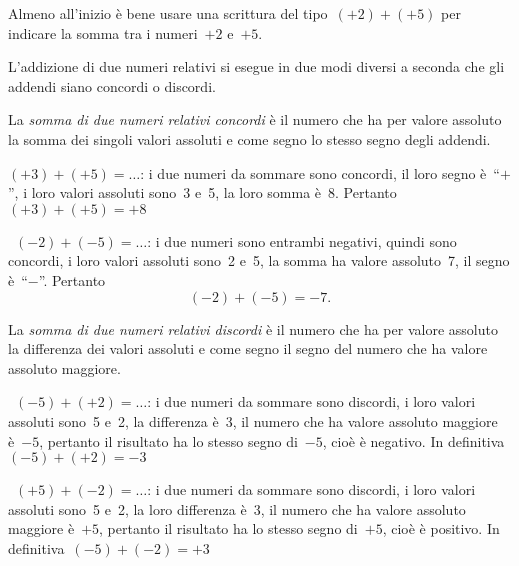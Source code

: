 Almeno all'inizio è bene usare una scrittura del tipo~\((+2)+(+5)\) per 
indicare la somma tra i numeri~\(+2\) e~\(+5\).

L'addizione di due numeri relativi si esegue in due modi diversi a seconda 
che 
gli addendi siano concordi o discordi.

La \emph{somma di due numeri relativi concordi} è il numero che ha per 
valore 
assoluto la somma dei singoli valori assoluti e
come segno lo stesso segno degli addendi.
 \begin{esempio}{}{}
\( (+3)+(+5)=\ldots\): i due numeri da sommare sono concordi, 
il loro segno è~``\(+\)'', i loro valori assoluti sono~3 e~5,
la loro somma è~8. Pertanto~\((+3)+(+5)=+8\)
 \end{esempio}

 \begin{esempio}{}{}
~\((-2)+(-5)=\ldots\): i due numeri sono entrambi negativi, quindi sono 
concordi, 
i loro valori assoluti sono~2 e~5,
la somma ha valore assoluto~7, il segno è~``\(-\)''. Pertanto
\[(-2)+(-5)=-7.\]
 \end{esempio}


La \emph{somma di due numeri relativi discordi} è il numero che ha per 
valore 
assoluto la differenza dei valori assoluti
e come segno il segno del numero che ha valore assoluto maggiore.

 \begin{esempio}{}{}
~\((-5)+(+2)=\ldots\): i due numeri da sommare sono discordi, i loro valori 
assoluti sono~5 e~2, la differenza è~3,
il numero che ha valore assoluto maggiore è~\(-5\), pertanto il risultato 
ha lo 
stesso segno di~\(-5\), cioè è negativo.
In definitiva~\((-5)+(+2)=-3\)
 \end{esempio}

 \begin{esempio}{}{}
~\((+5)+(-2)=\ldots\): i due numeri da sommare sono discordi, i loro valori 
assoluti sono~5 e~2, la loro differenza è~3,
il numero che ha valore assoluto maggiore è~\(+5\), pertanto il risultato 
ha lo 
stesso segno di~\(+5\),
cioè è positivo. In definitiva~\((-5)+(-2)=+3\)
 \end{esempio}

